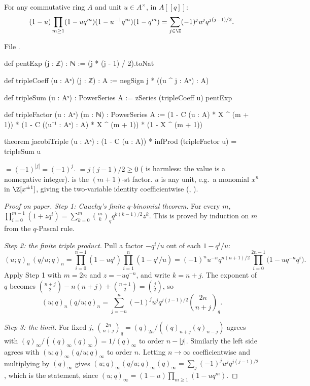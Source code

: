 \begin{theorem}\label{l25:thm:jtp}
For any commutative ring $A$ and unit $u\in A^\times$, in $A[[q]]$:
\begin{equation*}
(1-u)\prod_{m\ge1}(1-uq^m)(1-u^{-1}q^m)(1-q^m)=\sum_{j\in\Z}(-1)^ju^jq^{j(j-1)/2}.
\end{equation*}
\end{theorem}
\noindent File .
\begin{leancode}
def pentExp (j : ℤ) : ℕ := (j * (j - 1) / 2).toNat

def tripleCoeff (u : Aˣ) (j : ℤ) : A := negSign j * ((u ^ j : Aˣ) : A)

def tripleSum (u : Aˣ) : PowerSeries A := zSeries (tripleCoeff u) pentExp

def tripleFactor (u : Aˣ) (m : ℕ) : PowerSeries A :=
  (1 - C (u : A) * X ^ (m + 1)) * (1 - C ((u⁻¹ : Aˣ) : A) * X ^ (m + 1)) * (1 - X ^ (m + 1))

theorem jacobiTriple (u : Aˣ) :
    (1 - C (u : A)) * infProd (tripleFactor u) = tripleSum u
\end{leancode}
\begin{dictionary}
 $=(-1)^{|j|}=(-1)^j$.  $=j(j-1)/2\ge0$ ( is harmless: the value is
a nonnegative integer).  is the $(m+1)$-st factor. $u$ is any unit, e.g.\ a monomial
$x^n$ in $\Z[x^{\pm1}]$, giving the two-variable identity coefficientwise (,
).
\end{dictionary}
\begin{proof}[Proof on paper]
\emph{Step 1: Cauchy's finite $q$-binomial theorem.} For every $m$,
$\prod_{i=0}^{m-1}(1+zq^i)=\sum_{k=0}^m\binom mk_qq^{k(k-1)/2}z^k$. This is proved by induction on $m$ from the
$q$-Pascal rule.

\emph{Step 2: the finite triple product.} Pull a factor $-q^i/u$ out of each $1-q^i/u$:
\begin{equation*}
(u;q)_n\,(q/u;q)_n=\prod_{i=0}^{n-1}(1-uq^i)\prod_{i=1}^{n}(1-q^i/u)
=(-1)^nu^{-n}q^{n(n+1)/2}\prod_{i=0}^{2n-1}\big(1-uq^{-n}q^{i}\big).
\end{equation*}
Apply Step 1 with $m=2n$ and $z=-uq^{-n}$, and write $k=n+j$. The exponent of $q$ becomes
$\binom{n+j}{2}-n(n+j)+\binom{n+1}{2}=\binom j2$, so
\begin{equation*}
(u;q)_n(q/u;q)_n=\sum_{j=-n}^{n}(-1)^ju^jq^{j(j-1)/2}\binom{2n}{n+j}_q .
\end{equation*}

\emph{Step 3: the limit.} For fixed $j$, $\binom{2n}{n+j}_q=(q)_{2n}/((q)_{n+j}(q)_{n-j})$ agrees with
$(q)_\infty/((q)_\infty(q)_\infty)=1/(q)_\infty$ to order $n-|j|$. Similarly the left side agrees with
$(u;q)_\infty(q/u;q)_\infty$ to order $n$. Letting $n\to\infty$ coefficientwise and multiplying by $(q)_\infty$ gives
$(u;q)_\infty(q/u;q)_\infty(q)_\infty=\sum_j(-1)^ju^jq^{j(j-1)/2}$, which is the statement, since
$(u;q)_\infty=(1-u)\prod_{m\ge1}(1-uq^m)$.
\end{proof}
